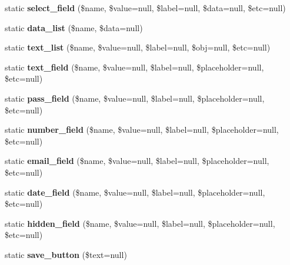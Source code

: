 \begin{DoxyCompactItemize}
\mbox{\label{class_component_a093db9051cb1610137758302727e494a}} 
static {\bfseries select\+\_\+field} (\$name, \$value=null, \$label=null, \$data=null, \$etc=null)
\item 
\mbox{\label{class_component_ac722df7a18c38959b96d56af618d6df9}} 
static {\bfseries data\+\_\+list} (\$name, \$data=null)
\item 
\mbox{\label{class_component_a36daf8e66edbc7ac8101b2d092767557}} 
static {\bfseries text\+\_\+list} (\$name, \$value=null, \$label=null, \$obj=null, \$etc=null)
\item 
\mbox{\label{class_component_a0bb8f7cbe578dc02d1de0baabd981584}} 
static {\bfseries text\+\_\+field} (\$name, \$value=null, \$label=null, \$placeholder=null, \$etc=null)
\item 
\mbox{\label{class_component_a8b530819d36968a4d976588899740a08}} 
static {\bfseries pass\+\_\+field} (\$name, \$value=null, \$label=null, \$placeholder=null, \$etc=null)
\item 
\mbox{\label{class_component_a10fcfdf903c0a8483605ce0f9862a73d}} 
static {\bfseries number\+\_\+field} (\$name, \$value=null, \$label=null, \$placeholder=null, \$etc=null)
\item 
\mbox{\label{class_component_aeea610044c5a49f21f1e22c3e19cf1b4}} 
static {\bfseries email\+\_\+field} (\$name, \$value=null, \$label=null, \$placeholder=null, \$etc=null)
\item 
\mbox{\label{class_component_a4c0086fa795ad9c75fbf83313ac02ae6}} 
static {\bfseries date\+\_\+field} (\$name, \$value=null, \$label=null, \$placeholder=null, \$etc=null)
\item 
\mbox{\label{class_component_a7c42bda629a6afdff8f95ebb1af30682}} 
static {\bfseries hidden\+\_\+field} (\$name, \$value=null, \$label=null, \$placeholder=null, \$etc=null)
\item 
\mbox{\label{class_component_acb686934131da772e5ee51cb361d4833}} 
static {\bfseries save\+\_\+button} (\$text=null)

\end{DoxyCompactItemize}

